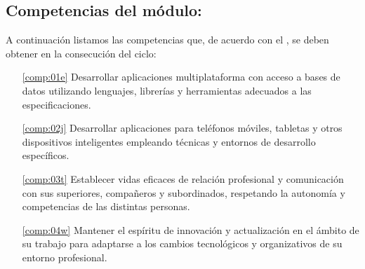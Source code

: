 \subsection{Competencias del módulo:}

A continuación listamos las competencias que, de acuerdo con el , se deben obtener en la consecución del ciclo:

\begin{itemize}
\item[\ref{comp:01e}] Desarrollar aplicaciones multiplataforma con acceso a bases de datos utilizando lenguajes, librerías y herramientas adecuados a las especificaciones.
\item[\ref{comp:02j}] Desarrollar aplicaciones para teléfonos móviles, tabletas y otros dispositivos inteligentes empleando técnicas y entornos de desarrollo específicos.
\item[\ref{comp:03t}] Establecer vidas eficaces de relación profesional y comunicación con sus superiores, compañeros y subordinados, respetando la autonomía y competencias de las distintas personas.
\item[\ref{comp:04w}] Mantener el espíritu de innovación y actualización en el ámbito de su trabajo para adaptarse a los cambios tecnológicos y organizativos de su entorno profesional.
\end{itemize}
